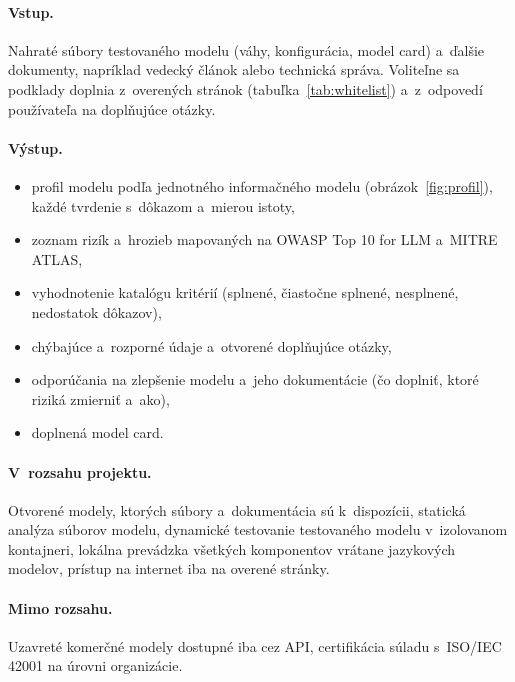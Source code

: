 \paragraph{Vstup.} Nahraté súbory testovaného modelu (váhy, konfigurácia,
model card) a~ďalšie dokumenty, napríklad vedecký článok alebo technická
správa. Voliteľne sa podklady doplnia z~overených stránok
(tabuľka~\ref{tab:whitelist}) a~z~odpovedí používateľa na doplňujúce
otázky.

\paragraph{Výstup.}
\begin{itemize}
    \item profil modelu podľa jednotného informačného modelu
    (obrázok~\ref{fig:profil}), každé tvrdenie s~dôkazom a~mierou istoty,
    \item zoznam rizík a~hrozieb mapovaných na OWASP Top 10 for LLM
    a~MITRE ATLAS,
    \item vyhodnotenie katalógu kritérií (splnené, čiastočne splnené,
    nesplnené, nedostatok dôkazov),
    \item chýbajúce a~rozporné údaje a~otvorené doplňujúce otázky,
    \item odporúčania na zlepšenie modelu a~jeho dokumentácie (čo doplniť,
    ktoré riziká zmierniť a~ako),
    \item doplnená model card.
\end{itemize}

\paragraph{V~rozsahu projektu.} Otvorené modely, ktorých súbory
a~dokumentácia sú k~dispozícii, statická analýza súborov modelu,
dynamické testovanie testovaného modelu v~izolovanom kontajneri, lokálna
prevádzka všetkých komponentov vrátane jazykových modelov, prístup na
internet iba na overené stránky.

\paragraph{Mimo rozsahu.} Uzavreté komerčné modely dostupné iba cez API,
certifikácia súladu s~ISO/IEC 42001 na úrovni organizácie.
